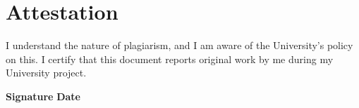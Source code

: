 \chapter*{Attestation}
    I understand the nature of plagiarism, and I am aware of the University’s policy on this.
    I certify that this document reports original work by me during my University project.

    \vspace{20mm}

    \textbf{Signature} \hfill \textbf{Date}
